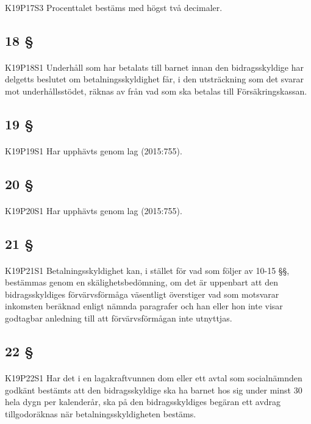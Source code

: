 \documentclass[a4paper,notitlepage,openany,10pt]{book}
\begin{document}
\paragraph*{}
{\tiny K19P17S3}
Procenttalet bestäms med högst två decimaler.
\subsection*{18 §}
\paragraph*{}
{\tiny K19P18S1}
Underhåll som har betalats till barnet innan den bidragsskyldige har delgetts beslutet om betalningsskyldighet får, i den utsträckning som det svarar mot underhållsstödet, räknas av från vad som ska betalas till Försäkringskassan.
\subsection*{19 §}
\paragraph*{}
{\tiny K19P19S1}
Har upphävts genom
lag (2015:755).
\subsection*{20 §}
\paragraph*{}
{\tiny K19P20S1}
Har upphävts genom
lag (2015:755).
\subsection*{21 §}
\paragraph*{}
{\tiny K19P21S1}
Betalningsskyldighet kan, i stället för vad som följer av 10-15 §§, bestämmas genom en skälighetsbedömning, om det är uppenbart att den bidragsskyldiges förvärvsförmåga väsentligt överstiger vad som motsvarar inkomsten beräknad enligt nämnda paragrafer och han eller hon inte visar godtagbar anledning till att förvärvsförmågan inte utnyttjas.
\subsection*{22 §}
\paragraph*{}
{\tiny K19P22S1}
Har det i en lagakraftvunnen dom eller ett avtal som socialnämnden godkänt bestämts att den bidragsskyldige ska ha barnet hos sig under minst 30 hela dygn per kalenderår, ska på den bidragsskyldiges begäran ett avdrag tillgodoräknas när betalningsskyldigheten bestäms.
\end{document}

